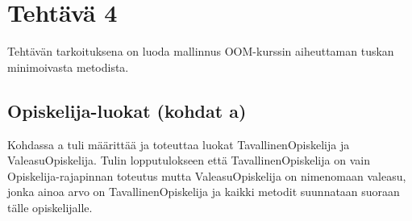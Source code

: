 
\chapter{Tehtävä 4 \label{chap:Teht=0000E4v=0000E4-4}}

Tehtävän tarkoituksena on luoda mallinnus OOM-kurssin aiheuttaman tuskan minimoivasta metodista.

\section{Opiskelija-luokat (kohdat a)}

\label{Opiskelija-luokat}

Kohdassa a tuli määrittää ja toteuttaa luokat TavallinenOpiskelija ja ValeasuOpiskelija. Tulin lopputulokseen että TavallinenOpiskelija on vain Opiskelija-rajapinnan toteutus mutta ValeasuOpiskelija on nimenomaan valeasu, jonka ainoa arvo on TavallinenOpiskelija ja kaikki metodit suunnataan suoraan tälle opiskelijalle.

